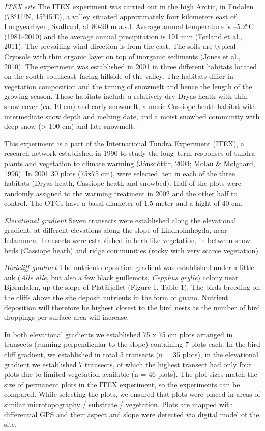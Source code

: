 \documentclass[a4paper]{article}
\begin{document}
\emph{ITEX site} The ITEX experiment was carried out in the high Arctic, in Endalen (78°11`N, 15°45`E), a valley situated approximately four kilometers east of Longyearbyen, Svalbard, at 80-90 m a.s.l.
Average annual temperature is --5.2°C (1981--2010) and the average annual precipitation is 191 mm (Førland et al., 2011).
The prevailing wind direction is from the east.
The soils are typical Cryosols with thin organic layer on top of inorganic sediments (Jones et al., 2010).
The experiment was established in 2001 in three different habitats located on the south--southeast--facing hillside of the valley.
The habitats differ in vegetation composition and the timing of snowmelt and hence the length of the growing season.
These habitats include a relatively dry Dryas heath with thin snow cover (ca. 10 cm) and early snowmelt, a mesic Cassiope heath habitat with intermediate snow depth and melting date, and a moist snowbed community with deep snow (\textgreater{} 100 cm) and late snowmelt.

This experiment is a part of the International Tundra Experiment (ITEX), a research network established in 1990 to study the long--term responses of tundra plants and vegetation to climate warming (Jónsdóttir, 2004; Molau \& Mølgaard, 1996).
In 2001 30 plots (75x75 cm), were selected, ten in each of the three habitats (Dryas heath, Cassiope heath and snowbed). Half of the plots were randomly assigned to the warming treatment in 2002 and the other half to control. The OTCs have a basal diameter of 1.5 meter and a hight of 40 cm.

\emph{Elevational gradient} Seven transects were established along the elevational gradient, at different elevations along the slope of Lindholmhøgda, near Isdammen. Transects were established in herb-like vegetation, in between snow beds (Cassiope heath) and ridge communities (rocky with very scarce vegetation).

\emph{Birdcliff gradinet} The nutrient deposition gradient was established under a little auk (\emph{Alle alle}, but also a few black guillemots, \emph{Cepphus grylle}) colony near Bjørndalen, up the slope of Platåfjellet (Figure 1, Table 1).
The birds breeding on the cliffs above the site deposit nutrients in the form of guano.
Nutrient deposition will therefore be highest closest to the bird nests as the number of bird droppings per surface area will increase.

In both elevational gradients we established 75 x 75 cm plots arranged in transects (running perpendicular to the slope) containing 7 plots each.
In the bird cliff gradient, we established in total 5 transects (n = 35 plots), in the elevational gradient we established 7 transects, of which the highest transect had only four plots due to limited vegetation available (n = 46 plots).
The plot sizes match the size of permanent plots in the ITEX experiment, so the experiments can be compared.
While selecting the plots, we ensured that plots were placed in areas of similar microtopography / substrate / vegetation.
Plots are mapped with differential GPS and their aspect and slope were detected via digital model of the site.
\end{document}
